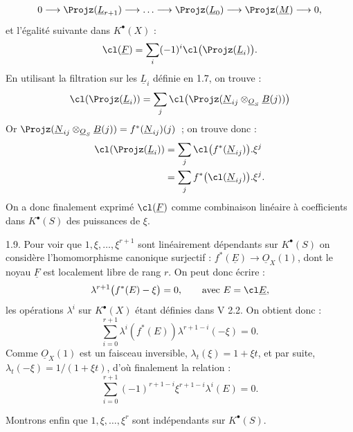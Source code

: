
\[
  0\longrightarrow \Projz(\underline{L}_{r+1})\longrightarrow\ldots\longrightarrow
  \Projz(\underline{L}_0)\longrightarrow\Projz(\underline{M})\longrightarrow 0,
\]
et l'égalité suivante dans \(K^{\bullet}(X)\) :
\[
  \cl(\underline{F})=\sum_i(-1)^i\cl\bigl(\Projz(\underline{L}_i)\bigr).
\]
En utilisant la filtration sur les \(\underline{L}_i\) définie en 1.7, on trouve :
\[
  \cl(\Projz(\underline{L}_i))=\sum_j \cl\bigl(\Projz(\underline{N}_{ij}\otimes_{\underline{O}_S}\underline{B}(j))\bigr)
\]
Or \(\Projz(\underline{N}_{ij}\otimes_{\underline{O}_S}\underline{B}(j))=f^*(\underline{N}_{ij})(j)\)~; on trouve donc :
\[
\begin{aligned}
  \cl(\Projz(\underline{L}_i))
  &=\sum_j \cl\bigl(f^*(\underline{N}_{ij})\bigr).\xi^j \\
  &=\sum_j f^*\bigl(\cl(\underline{N}_{ij})\bigr).\xi^j.
\end{aligned}
\]
On a donc finalement exprimé \(\cl(\underline{F})\) comme combinaison linéaire à coefficients dans \(K^{\bullet}(S)\) des puissances de \(\xi\).

1.9. Pour voir que \(1,\xi,\ldots,\xi^{r+1}\) sont linéairement dépendants sur \(K^{\bullet}(S)\) on considère l'homomorphisme canonique surjectif : \(f^*(\underline{E})\to\underline{O}_X(1)\), dont le noyau \(\underline{F}\) est localement libre de rang \(r\). On peut donc écrire :
\[
  \lambda^{r+1}\bigl(f^*(E)-\xi\bigr)=0,
  \qquad \text{avec } E=\cl\underline{E},
\]
les opérations \(\lambda^i\) sur \(K^{\bullet}(X)\) étant définies dans V 2.2. On obtient donc :
\[
  \sum_{i=0}^{r+1}\lambda^i(f^*(E))\lambda^{r+1-i}(-\xi)=0.
\]
Comme \(\underline{O}_X(1)\) est un faisceau inversible, \(\lambda_t(\xi)=1+\xi t\), et par suite, \(\lambda_t(-\xi)=1/(1+\xi t)\), d'où finalement la relation :
\begin{equation}\tag{1.9.1}
  \sum_{i=0}^{r+1}(-1)^{r+1-i}\xi^{r+1-i}\lambda^i(E)=0.
\end{equation}

Montrons enfin que \(1,\xi,\ldots,\xi^r\) sont indépendants sur \(K^{\bullet}(S)\).


